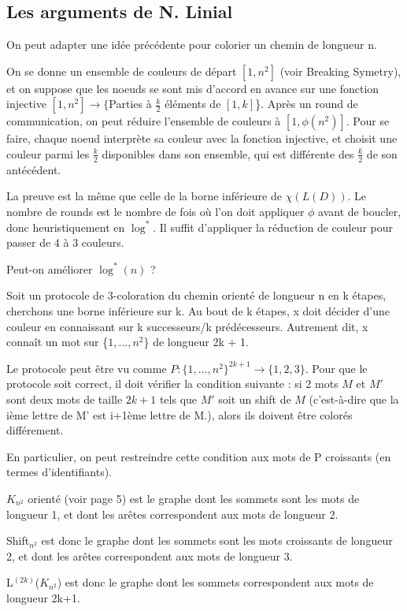 \subsection{Les arguments de N. Linial}

On peut adapter une idée précédente pour colorier un chemin de longueur n.

On se donne un ensemble de couleurs de départ $[1,n^2]$ (voir Breaking Symetry), et on suppose que les noeuds se sont mis d'accord en avance sur une fonction injective $[1,n^2] \longrightarrow \{$Parties à $\frac{k}{2}$ éléments de $[1,k]$\}. Après un round de communication, on peut réduire l'ensemble de couleurs à $[1,\phi (n^2)]$. Pour se faire, chaque noeud interprète sa couleur avec la fonction injective, et choisit une couleur parmi les $\frac{k}{2}$ disponibles dans son ensemble, qui est différente des $\frac{k}{2}$ de son antécédent.

\begin{correction}
	La preuve est la même que celle de la borne inférieure de $\chi(L(D))$. Le nombre de rounds est le nombre de fois où l'on doit appliquer $\phi$ avant de boucler, donc heuristiquement en $\log^*$. Il suffit d'appliquer la réduction de couleur pour passer de 4 à 3 couleurs.
\end{correction}

Peut-on améliorer $\log ^*(n)$ ?

Soit un protocole de 3-coloration du chemin orienté de longueur n en k étapes, cherchons une borne inférieure sur k. Au bout de k étapes, x doit décider d'une couleur en connaissant sur k successeurs/k prédécesseurs. Autrement dit, x connaît un mot sur \{$1,...,n^2$\} de longueur 2k + 1.

Le protocole peut être vu comme $P : \{ 1,...,n^2\}^{2k+1} \longrightarrow \{1,2,3\}$. Pour que le protocole soit correct, il doit vérifier la condition suivante : si 2 mots $M$ et $M'$ sont deux mots de taille $2k+1$ tels que $M'$ soit un shift de $M$ (c'est-à-dire que la ième lettre de M' est i+1ème lettre de M.), alors ils doivent être colorés différement.

En particulier, on peut restreindre cette condition aux mots de P croissants (en termes d'identifiants). 

\begin{note}
	$K_{n^2}$ orienté (voir page 5) est le graphe dont les sommets sont les mots de longueur 1, et dont les arêtes correspondent aux mots de longueur 2.
	
	Shift$_{n^2}$ est donc le graphe dont les sommets sont les mots croissants de longueur 2, et dont les arêtes correspondent aux mots de longueur 3.
	
	L$^{(2k)}$($K_{n^2}$) est donc le graphe dont les sommets correspondent aux mots de longueur 2k+1.
\end{note}

